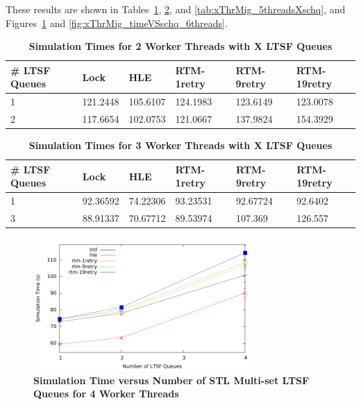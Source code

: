 \documentclass[11pt]{book}
\begin{document}
These results are shown in
Tables~\ref{tab:xThrMig_2threadsXschq}, \ref{tab:xThrMig_3threadsXschq}, and
\ref{tab:xThrMig_5threadsXschq}, and Figures~\ref{fig:xThrMig_timeVSschq_4threads} and
\ref{fig:xThrMig_timeVSschq_6threads}.

\begin{table}
    \centering
    \begin{tabular}{l|p{2cm}|p{2cm}|p{2cm}|p{2cm}|p{2cm}}
        \textbf{\# LTSF Queues}&Lock &HLE &RTM-1retry &RTM-9retry &RTM-19retry \\
        \hline
        \midrule
            1 &121.2448  &105.6107 &124.1983 &123.6149 &123.0078\\ 
            2 &117.6654  &102.0753 &121.0667 &137.9824 &154.3929\\
    \end{tabular}
    \caption{\textbf{Simulation Times for 2 Worker Threads with X LTSF
        Queues}}\label{tab:xThrMig_2threadsXschq} 
\end{table}

\begin{table}
    \centering
    \begin{tabular}{l|p{2cm}|p{2cm}|p{2cm}|p{2cm}|p{2cm}}
        \textbf{\# LTSF Queues}&Lock &HLE &RTM-1retry &RTM-9retry &RTM-19retry \\
        \hline
        \midrule
            1 &92.36592  &74.22306 &93.23531  &92.67724 &92.6402 \\ 
            3 &88.91337  &70.67712 &89.53974  &107.369  &126.557 \\
    \end{tabular}
    \caption{\textbf{Simulation Times for 3 Worker Threads with X LTSF
        Queues}}\label{tab:xThrMig_3threadsXschq} 
\end{table}

\begin{figure}
    \centering
    \graphicspath{ {./figures/} }
    \includegraphics[width=0.75\textwidth,keepaspectratio]{hugeepidemicsim-XEVENTmig-timeVSschedQs-multiset-4thread}
    \caption{\textbf{Simulation Time versus Number of STL Multi-set LTSF Queues for 4
        Worker Threads}}\label{fig:xThrMig_timeVSschq_4threads}
\end{figure}
\end{document}
